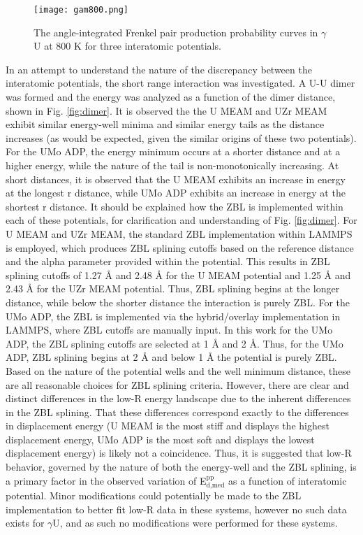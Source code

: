 \documentclass[review]{elsarticle}
\begin{document}
\begin{figure}[h]
 \centering
 \texttt{[image: gam800.png]} 
 \caption{The angle-integrated Frenkel pair production probability curves in $\gamma$U at 800 K for three interatomic potentials.}
 \label{fig:gam800}
\end{figure}

\FloatBarrier

In an attempt to understand the nature of the discrepancy between the interatomic potentials, the short range interaction was investigated. A U-U dimer was formed and the energy was analyzed as a function of the dimer distance, shown in Fig. \ref{fig:dimer}. It is observed the the U MEAM and UZr MEAM exhibit similar energy-well minima and similar energy tails as the distance increases (as would be expected, given the similar origins of these two potentials). For the UMo ADP, the energy minimum occurs at a shorter distance and at a higher energy, while the nature of the tail is non-monotonically increasing. At short distances, it is observed that the U MEAM exhibits an increase in energy at the longest r distance, while UMo ADP exhibits an increase in energy at the shortest r distance. It should be explained how the ZBL is implemented within each of these potentials, for clarification and understanding of Fig. \ref{fig:dimer}. For U MEAM and UZr MEAM, the standard ZBL implementation within LAMMPS is employed, which produces ZBL splining cutoffs based on the reference distance and the alpha parameter provided within the potential. This results in ZBL splining cutoffs of 1.27 {\AA} and 2.48 {\AA} for the U MEAM potential and 1.25 {\AA} and 2.43 {\AA} for the UZr MEAM potential. Thus, ZBL splining begins at the longer distance, while below the shorter distance the interaction is purely ZBL. For the UMo ADP, the ZBL is implemented via the hybrid/overlay implementation in LAMMPS, where ZBL cutoffs are manually input. In this work for the UMo ADP, the ZBL splining cutoffs are selected at 1 {\AA} and 2 {\AA}. Thus, for the UMo ADP, ZBL splining begins at 2 {\AA} and below 1 {\AA} the potential is purely ZBL. Based on the nature of the potential wells and the well minimum distance, these are all reasonable choices for ZBL splining criteria. However, there are clear and distinct differences in the low-R energy landscape due to the inherent differences in the ZBL splining. That these differences correspond exactly to the differences in displacement energy (U MEAM is the most stiff and displays the highest displacement energy, UMo ADP is the most soft and displays the lowest displacement energy) is likely not a coincidence. Thus, it is suggested that low-R behavior, governed by the nature of both the energy-well and the ZBL splining, is a primary factor in the observed variation of E$^{\textrm{pp}}_{\textrm{d,med}}$ as a function of interatomic potential. Minor modifications could potentially be made to the ZBL implementation to better fit low-R data in these systems, however no such data exists for $\gamma$U, and as such no modifications were performed for these systems.
\end{document}
